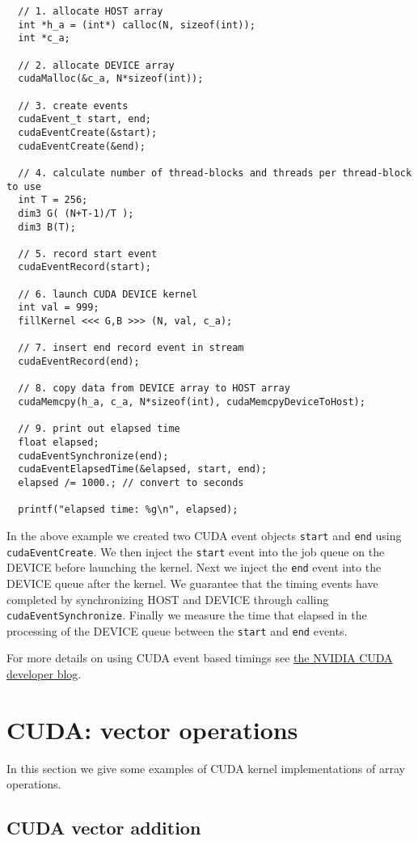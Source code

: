 \begin{verbatim}
  // 1. allocate HOST array
  int *h_a = (int*) calloc(N, sizeof(int));
  int *c_a;

  // 2. allocate DEVICE array
  cudaMalloc(&c_a, N*sizeof(int));

  // 3. create events
  cudaEvent_t start, end;
  cudaEventCreate(&start);
  cudaEventCreate(&end);

  // 4. calculate number of thread-blocks and threads per thread-block to use
  int T = 256;
  dim3 G( (N+T-1)/T );
  dim3 B(T);

  // 5. record start event
  cudaEventRecord(start);

  // 6. launch CUDA DEVICE kernel
  int val = 999;
  fillKernel <<< G,B >>> (N, val, c_a);

  // 7. insert end record event in stream
  cudaEventRecord(end);

  // 8. copy data from DEVICE array to HOST array
  cudaMemcpy(h_a, c_a, N*sizeof(int), cudaMemcpyDeviceToHost);

  // 9. print out elapsed time
  float elapsed;
  cudaEventSynchronize(end);
  cudaEventElapsedTime(&elapsed, start, end);
  elapsed /= 1000.; // convert to seconds

  printf("elapsed time: %g\n", elapsed);
\end{verbatim}
In the above example we created two CUDA event objects \texttt{start} and \texttt{end} using \texttt{cudaEventCreate}. We then inject the \texttt{start} event into the job queue on the DEVICE before launching the kernel. Next we inject the \texttt{end} event into the DEVICE queue after the kernel. We guarantee that the timing events have completed by synchronizing HOST and DEVICE through calling \texttt{cudaEventSynchronize}. Finally we measure the time that elapsed in the processing of the DEVICE queue between the \texttt{start} and \texttt{end} events.


For more details on using CUDA event based timings see \href{https://devblogs.nvidia.com/how-implement-performance-metrics-cuda-cc/}{the NVIDIA CUDA developer blog}.

\section{CUDA: vector operations}

In this section we give some examples of CUDA kernel implementations of array operations.

\subsection{CUDA vector addition}

